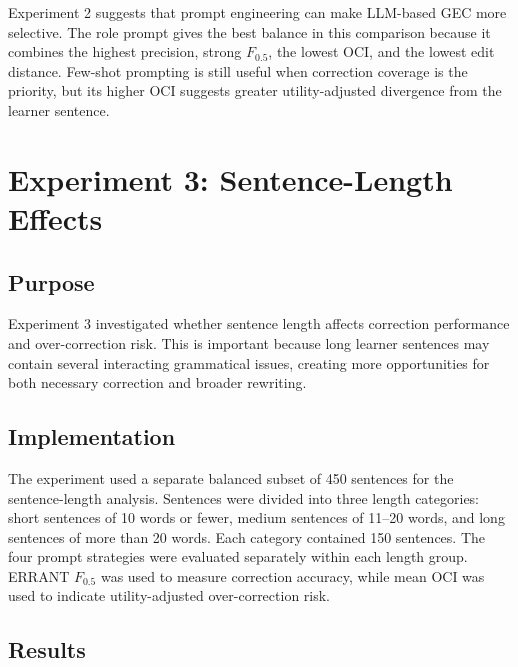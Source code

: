 Experiment 2 suggests that prompt engineering can make LLM-based GEC more selective. The role prompt gives the best balance in this comparison because it combines the highest precision, strong $F_{0.5}$, the lowest OCI, and the lowest edit distance. Few-shot prompting is still useful when correction coverage is the priority, but its higher OCI suggests greater utility-adjusted divergence from the learner sentence.

\section{Experiment 3: Sentence-Length Effects}

\subsection{Purpose}

Experiment 3 investigated whether sentence length affects correction performance and over-correction risk. This is important because long learner sentences may contain several interacting grammatical issues, creating more opportunities for both necessary correction and broader rewriting.

\subsection{Implementation}

The experiment used a separate balanced subset of 450 sentences for the sentence-length analysis. Sentences were divided into three length categories: short sentences of 10 words or fewer, medium sentences of 11--20 words, and long sentences of more than 20 words. Each category contained 150 sentences. The four prompt strategies were evaluated separately within each length group. ERRANT $F_{0.5}$ was used to measure correction accuracy, while mean OCI was used to indicate utility-adjusted over-correction risk.

\subsection{Results}

